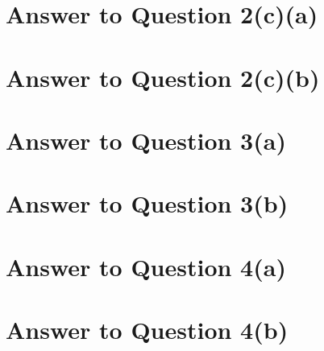\documentclass[11pt]{article}
\begin{document}
\section*{Answer to Question 2(c)(a)}

\section*{Answer to Question 2(c)(b)}

\section*{Answer to Question 3(a)}

\section*{Answer to Question 3(b)}

\section*{Answer to Question 4(a)}

\section*{Answer to Question 4(b)}
\end{document}
